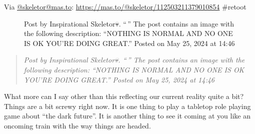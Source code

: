 Via \href{https://mas.to/@skeletor/}{@skeletor@mas.to}:
\url{https://mas.to/@skeletor/112503211379010854} \#retoot

\begin{figure}
\centering
{}
\caption{Post by Inspirational Skeletor💀. ``\,'' The post contains an
image with the following description: ``NOTHING IS NORMAL AND NO ONE IS
OK YOU'RE DOING GREAT.'' Posted on May 25, 2024 at 14:46}
\end{figure}

\begin{quote}
\emph{Post by Inspirational Skeletor💀. ``\,'' The post contains an
image with the following description: ``NOTHING IS NORMAL AND NO ONE IS
OK YOU'RE DOING GREAT.'' Posted on May 25, 2024 at 14:46}
\end{quote}

What more can I say other than this reflecting our current reality quite
a bit? Things are a bit screwy right now. It is one thing to play a
tabletop role playing game about ``the dark future''. It is another
thing to see it coming at you like an oncoming train with the way things
are headed.
